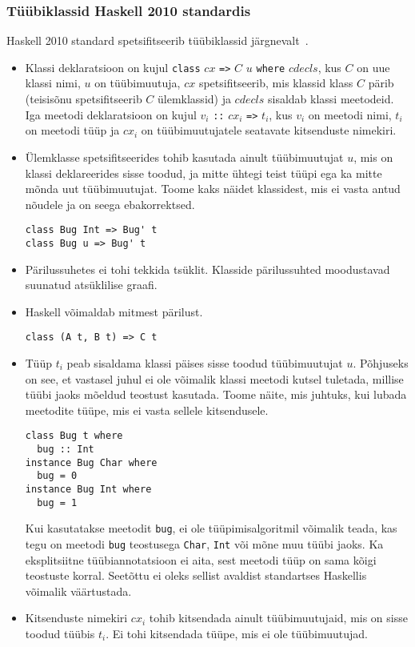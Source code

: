 \documentclass[12pt]{article}
\begin{document}
      \subsubsection{Tüübiklassid Haskell 2010 standardis}\label{haskstd}
        Haskell 2010 standard spetsifitseerib tüübiklassid järgnevalt~\cite{Has}.
        \begin{itemize}
          \item
            Klassi deklaratsioon on kujul \verb!class! $cx$ \verb!=>! $C$ $u$ \verb!where! $cdecls$, kus $C$ on uue klassi nimi, $u$ on tüübimuutuja, $cx$ spetsifitseerib, mis klassid klass $C$ pärib (teisisõnu spetsifitseerib $C$ ülemklassid) ja $cdecls$ sisaldab klassi meetodeid. Iga meetodi deklaratsioon on kujul $v_i$ \verb!::! $cx_i$ \verb!=>! $t_i$, kus $v_i$ on meetodi nimi, $t_i$ on meetodi tüüp ja $cx_i$ on tüübimuutujatele seatavate kitsenduste nimekiri.
          \item
            Ülemklasse spetsifitseerides tohib kasutada ainult tüübimuutujat $u$, mis on klassi deklareerides sisse toodud, ja mitte ühtegi teist tüüpi ega ka mitte mõnda uut tüübimuutujat. Toome kaks näidet klassidest, mis ei vasta antud nõudele ja on seega ebakorrektsed.

            \begin{verbatim}class Bug Int => Bug' t
class Bug u => Bug' t\end{verbatim}
          \item
            Pärilussuhetes ei tohi tekkida tsüklit. Klasside pärilussuhted moodustavad suunatud atsüklilise graafi.
          \item
            Haskell võimaldab mitmest pärilust.

            \begin{verbatim}class (A t, B t) => C t\end{verbatim}
          \item
            Tüüp $t_i$ peab sisaldama klassi päises sisse toodud tüübimuutujat $u$. Põhjuseks on see, et vastasel juhul ei ole võimalik klassi meetodi kutsel tuletada, millise tüübi jaoks mõeldud teostust kasutada. Toome näite, mis juhtuks, kui lubada meetodite tüüpe, mis ei vasta sellele kitsendusele.

            \begin{verbatim}class Bug t where
  bug :: Int
instance Bug Char where
  bug = 0
instance Bug Int where
  bug = 1\end{verbatim}

            Kui kasutatakse meetodit \verb!bug!, ei ole tüüpimisalgoritmil võimalik teada, kas tegu on meetodi \verb!bug! teostusega \verb!Char!, \verb!Int! või mõne muu tüübi jaoks. Ka eksplitsiitne tüübiannotatsioon ei aita, sest meetodi tüüp on sama kõigi teostuste korral. Seetõttu ei oleks sellist avaldist standartses Haskellis võimalik väärtustada.
          \item
            Kitsenduste nimekiri $cx_i$ tohib kitsendada ainult tüübimuutujaid, mis on sisse toodud tüübis $t_i$. Ei tohi kitsendada tüüpe, mis ei ole tüübimuutujad.


\end{itemize}
\end{document}
